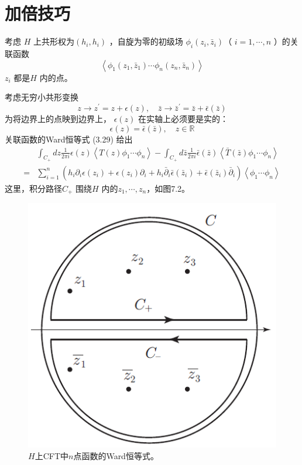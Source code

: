 \section{加倍技巧}
考虑 $H$ 上共形权为$ \left(h_{i}, h_{i}\right)$ ，自旋为零的初级场 $\phi_{i}\left(z_{i}, \bar{z}_{i}\right) $（ $i=1, \cdots, n$ ）的关联函数
$$
\left\langle\phi_{1}\left(z_{1}, \bar{z}_{1}\right) \cdots \phi_{n}\left(z_{n}, \bar{z}_{n}\right)\right\rangle
$$
$z_i$ 都是$ H$ 内的点。

考虑无穷小共形变换
\begin{equation}
	z \rightarrow z^{\prime}=z+\epsilon(z), \quad \bar{z} \rightarrow \bar{z}^{\prime}=\bar{z}+\bar{\epsilon}(\bar{z})
\end{equation} 
为将边界上的点映到边界上， $\epsilon(z)$ 在实轴上必须要是实的：
\begin{equation}
	\epsilon(z)=\bar{\epsilon}(\bar{z}), \quad z \in \mathbb{R}
\end{equation}
关联函数的Ward恒等式 (3.29) 给出
\begin{equation}
	\begin{aligned} & \int_{C_{+}} d z \frac{1}{2 \pi i} \epsilon(z)\left\langle T(z) \phi_{1} \cdots \phi_{n}\right\rangle-\int_{C_{+}} d \bar{z} \frac{1}{2 \pi i} \bar{\epsilon}(\bar{z})\left\langle\bar{T}(\bar{z}) \phi_{1} \cdots \phi_{n}\right\rangle \\ =&\sum_{i=1}^{n}\left(h_{i} \partial_{i} \epsilon\left(z_{i}\right)+\epsilon\left(z_{i}\right) \partial_{i}+h_{i} \bar{\partial}_{i} \bar{\epsilon}\left(\bar{z}_{i}\right)+\bar{\epsilon}\left(\bar{z}_{i}\right) \bar{\partial}_{i}\right)\left\langle\phi_{1} \cdots \phi_{n}\right\rangle \end{aligned}
\end{equation}
这里，积分路径$ C_+$ 围绕$ H$ 内的$ z_{1}, \cdots, z_{n} $，如图7.2。
\begin{figure}[h]
	\centering
	\includegraphics[width=0.6\linewidth]{fig/7.2.png}
	\caption{ $H$上CFT中$n$点函数的Ward恒等式。}
\end{figure}

